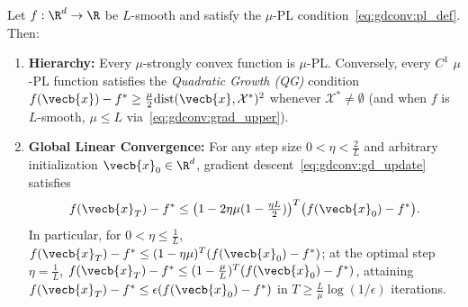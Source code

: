 \documentclass[../../../../master.tex]{subfiles}
\begin{document}
\begin{coremath}
\label{thm:gdconv:pl_rate}
Let $f : \R^d \to \R$ be $L$-smooth and satisfy the $\mu$-PL condition~\eqref{eq:gdconv:pl_def}. Then:
\begin{enumerate}
  \item \textbf{Hierarchy:} Every $\mu$-strongly convex function is $\mu$-PL. Conversely, every $C^1$ $\mu$-PL function satisfies the \emph{Quadratic Growth (QG)} condition $f(\vecb{x}) - f^* \ge \frac{\mu}{2}\mathrm{dist}(\vecb{x}, \mathcal{X}^*)^2$ whenever $\mathcal{X}^* \neq \emptyset$ (and when $f$ is $L$-smooth, $\mu \le L$ via~\eqref{eq:gdconv:grad_upper}).
  \item \textbf{Global Linear Convergence:} For any step size $0 < \eta < \frac{2}{L}$ and arbitrary initialization $\vecb{x}_0 \in \R^d$, gradient descent~\eqref{eq:gdconv:gd_update} satisfies
  \begin{equation}
  \label{eq:gdconv:pl_contraction}
    f(\vecb{x}_T) - f^* \le \big(1 - 2\eta\mu(1 - \tfrac{\eta L}{2})\big)^T \big(f(\vecb{x}_0) - f^*\big).
  \end{equation}
  In particular, for $0 < \eta \le \frac{1}{L}$, $f(\vecb{x}_T) - f^* \le (1 - \eta\mu)^T (f(\vecb{x}_0) - f^*)$; at the optimal step $\eta = \frac{1}{L}$, $f(\vecb{x}_T) - f^* \le (1 - \frac{\mu}{L})^T(f(\vecb{x}_0) - f^*)$, attaining $f(\vecb{x}_T) - f^* \le \epsilon(f(\vecb{x}_0) - f^*)$ in $T \ge \frac{L}{\mu}\log(1/\epsilon)$ iterations.
\end{enumerate}
\end{coremath}
\end{document}
